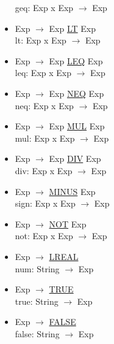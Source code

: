 \documentclass[\main/MemoriaPL.tex]{subfiles}
\begin{document}
\begin{itemize}
        geq: Exp x Exp $\rightarrow$ Exp
      \item Exp $\rightarrow$ Exp \underline{LT} Exp\\
        lt: Exp x Exp $\rightarrow$ Exp
      \item Exp $\rightarrow$ Exp \underline{LEQ} Exp\\
        leq: Exp x Exp $\rightarrow$ Exp
      \item Exp $\rightarrow$ Exp \underline{NEQ} Exp\\
        neq: Exp x Exp $\rightarrow$ Exp
      \item Exp $\rightarrow$ Exp \underline{MUL} Exp\\
        mul: Exp x Exp $\rightarrow$ Exp
      \item Exp $\rightarrow$ Exp \underline{DIV} Exp\\
        div: Exp x Exp $\rightarrow$ Exp
      \item Exp $\rightarrow$ \underline{MINUS} Exp\\
        sign: Exp x Exp $\rightarrow$ Exp
      \item Exp $\rightarrow$ \underline{NOT} Exp\\
        not: Exp x Exp $\rightarrow$ Exp
      \item Exp $\rightarrow$ \underline{LREAL}\\
        num: String $\rightarrow$ Exp
      \item Exp $\rightarrow$ \underline{TRUE}\\
        true: String $\rightarrow$ Exp
      \item Exp $\rightarrow$ \underline{FALSE}\\
        false: String $\rightarrow$ Exp
    \end{itemize}
\end{document}
